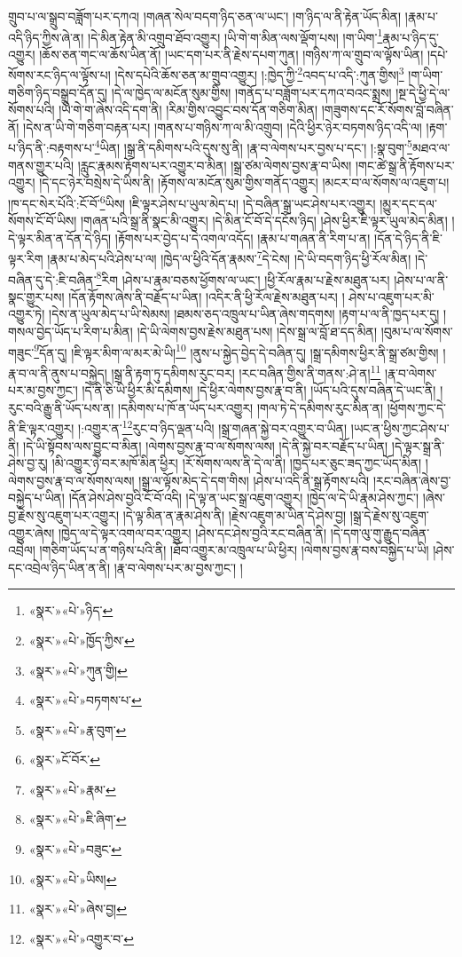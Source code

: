གྲུབ་པ་ལ་སྒྲུབ་བཟློག་པར་དཀའ། །གཞན་སེལ་བདག་ཉིད་ཅན་ལ་ཡང་། །ག་ཉིད་ལ་ནི་རྟེན་ཡོད་མིན། །རྣམ་པ་འདི་ཉིད་ཀྱིས་ཞེ་ན། །དེ་མིན་རྟེན་མི་འགྲུབ་ཐོབ་འགྱུར། །ཡི་གེ་ག་མིན་ལས་ལྡོག་པས། །ག་ཡིག་\footnote{«སྣར་»«པེ་»ཉིད་}རྣམ་པ་ཉིད་དུ་འགྱུར། །ཆོས་ཅན་གང་ལ་ཆོས་ཡིན་ནོ། །ཡང་དག་པར་ནི་རྗེས་དཔག་ཀུན། །གཉིས་ཀ་ལ་གྲུབ་ལ་ལྟོས་ཡིན། །དཔེ་སོགས་རང་ཉིད་ལ་ལྟོས་པ། །དེས་དཔེའི་ཆོས་ཅན་མ་གྲུབ་འགྱུར། །:ཁྱེད་ཀྱི་\footnote{«སྣར་»«པེ་»ཁྱོད་ཀྱིས་}འབད་པ་འདི་:ཀུན་གྱིས།\footnote{«སྣར་»«པེ་»ཀུན་གྱི།} །ག་ཡིག་གཅིག་ཉིད་བསྒྲུབ་དོན་དུ། །དེ་ལ་ཁྱེད་ལ་མངོན་སུམ་གྱིས། །གནོད་པ་བཟློག་པར་དཀའ་བའང་སྨྲས། །སྔ་དེ་ཕྱི་དེ་ལ་སོགས་པའི། །ཡི་གེ་ག་ཞེས་འདི་དག་ནི། །རིམ་གྱིས་འབྱུང་བས་དོན་གཅིག་མིན། །གཟུགས་དང་རོ་སོགས་བློ་བཞིན་ནོ། །དེས་ན་ཡི་གེ་གཅིག་བརྟན་པར། །གནས་པ་གཉིས་ཀ་ལ་མི་འགྲུབ། །དེའི་ཕྱིར་ཉེར་བཏགས་ཉིད་འདི་ལ། །རྟག་པ་ཉིད་ནི་:བརྟགས་པ་\footnote{«སྣར་»«པེ་»བཏགས་པ་}ཡིན། །སྒྲ་ནི་དམིགས་པའི་དུས་སུ་ནི། །རྣ་བ་ལེགས་པར་བྱས་པ་དང་། །:སྣ་བུག་\footnote{«སྣར་»«པེ་»རྣ་བུག་}མཐའ་ལ་གནས་གྱུར་པའི། །རླུང་རྣམས་རྟོགས་པར་འགྱུར་བ་མིན། །སྒྲ་ཙམ་ལེགས་བྱས་རྣ་བ་ཡིས། །གང་ཚེ་སྒྲ་ནི་རྟོགས་པར་འགྱུར། །དེ་དང་ཉེར་བསྲེས་དེ་ཡིས་ནི། །རྟོགས་ལ་མངོན་སུམ་གྱིས་གནོད་འགྱུར། །མངར་བ་ལ་སོགས་ལ་འཇུག་པ། །ཁ་དང་སེར་པོའི་:ངོ་བོ་\footnote{«སྣར་»ངོ་བོར་}ཡིས། །ཇི་ལྟར་ཤེས་པ་ཡུལ་མེད་པ། །དེ་བཞིན་སྒྲ་ཡང་ཤེས་པར་འགྱུར། །མྱུར་དང་དལ་སོགས་ངོ་བོ་ཡིས། །གཞན་པའི་སྒྲ་ནི་སྣང་མི་འགྱུར། །དེ་མིན་ངོ་བོ་དེ་དངོས་ཉིད། །ཤེས་ཕྱིར་ཇི་ལྟར་ཡུལ་མེད་མིན། །དེ་ལྟར་མིན་ན་དོན་དེ་ཉིད། །རྟོགས་པར་བྱེད་པ་དེ་འགལ་འདོད། །རྣམ་པ་གཞན་ནི་རིག་པ་ན། །དོན་དེ་ཉིད་ནི་ཇི་ལྟར་རིག །རྣམ་པ་མེད་པའི་ཤེས་པ་ལ། །ཁྱེད་ལ་ཕྱིའི་དོན་རྣམས་\footnote{«སྣར་»«པེ་»རྣམ་}དེ་ངེས། །དེ་ཡི་བདག་ཉིད་ཕྱི་རོལ་མིན། །དེ་བཞིན་དུ་དེ་:ཇི་བཞིན་\footnote{«སྣར་»«པེ་»ཇི་ཞིག་}རིག །ཤེས་པ་རྣམ་བཅས་ཕྱོགས་ལ་ཡང་། །ཕྱི་རོལ་རྣམ་པ་རྗེས་མཐུན་པར། །ཤེས་པ་ལ་ནི་སྣང་གྱུར་པས། །དོན་རྟོགས་ཞེས་ནི་བརྗོད་པ་ཡིན། །འདིར་ནི་ཕྱི་རོལ་རྗེས་མཐུན་པར། །
ཤེས་པ་འཇུག་པར་མི་འགྱུར་ཏེ། །དེས་ན་ཡུལ་མེད་པ་ཡི་སེམས། །ཐམས་ཅད་འཁྲུལ་པ་ཡིན་ཞེས་གདགས། །རྟག་པ་ལ་ནི་ཁྱད་པར་དུ། །གསལ་བྱེད་ཡོད་པ་རིག་པ་མིན། །དེ་ཡི་ལེགས་བྱས་རྗེས་མཐུན་པས། །དེས་སྒྲ་ལ་བློ་ཐ་དད་མིན། །བུམ་པ་ལ་སོགས་གཟུང་\footnote{«སྣར་»«པེ་»བཟུང་}དོན་དུ། །ཇི་ལྟར་མིག་ལ་མར་མེ་ཡི།\footnote{«སྣར་»«པེ་»ཡིས།} །ནུས་པ་སྐྱེད་བྱེད་དེ་བཞིན་དུ། །སྒྲ་དམིགས་ཕྱིར་ནི་སྒྲ་ཙམ་གྱིས། །རྣ་བ་ལ་ནི་ནུས་པ་བསྐྱེད། །སྒྲ་ནི་རྟག་ཏུ་དམིགས་རུང་བར། །རང་བཞིན་གྱིས་ནི་གནས་:ཤེ་ན།\footnote{«སྣར་»«པེ་»ཞེས་བྱ།} །རྣ་བ་ལེགས་པར་མ་བྱས་ཀྱང་། །དེ་ནི་ཅི་ཡི་ཕྱིར་མི་དམིགས། །དེ་ཕྱིར་ལེགས་བྱས་རྣ་བ་ནི། །ཡོད་པའི་དུས་བཞིན་དེ་ཡང་ནི། །རུང་བའི་རྒྱུ་ནི་ཡོད་པས་ན། །དམིགས་པ་ཁོ་ན་ཡོད་པར་འགྱུར། །གལ་ཏེ་དེ་དམིགས་རུང་མིན་ན། །ཕྱོགས་ཀྱང་དེ་ནི་ཇི་ལྟར་འགྱུར། །:འགྱུར་ན་\footnote{«སྣར་»«པེ་»འགྱུར་བ་}རུང་བ་ཉིད་ལྡན་པའི། །སྒྲ་གཞན་སྐྱེ་བར་འགྱུར་བ་ཡིན། །ཡང་ན་ཕྱིས་ཀྱང་ཤེས་པ་ནི། །དེ་ཡི་སྟོབས་ལས་བྱུང་བ་མིན། །ལེགས་བྱས་རྣ་བ་ལ་སོགས་ལས། །དེ་ནི་སྐྱེ་བར་བརྗོད་པ་ཡིན། །དེ་ལྟར་སྒྲ་ནི་ཤེས་བྱ་རུ། །མི་འགྱུར་ཉེ་བར་མཁོ་མིན་ཕྱིར། །རོ་སོགས་ལས་ནི་དེ་ལ་ནི། །ཁྱད་པར་ཅུང་ཟད་ཀྱང་ཡོད་མིན། །ལེགས་བྱས་རྣ་བ་ལ་སོགས་ལས། །སྒྲ་ལ་ལྟོས་མེད་དེ་དག་གིས། །ཤེས་པ་འདི་ནི་སྒྲ་རྟོགས་པའི། །རང་བཞིན་ཞེས་བྱ་བསྐྱེད་པ་ཡིན། །དོན་ཤེས་ཤེས་བྱའི་ངོ་བོ་འདི། །དེ་ལྟ་ན་ཡང་སྒྲ་འཇུག་འགྱུར། །ཁྱེད་ལ་དེ་ཡི་རྣམ་ཤེས་ཀྱང་། །ཞེས་བྱ་རྗེས་སུ་འཇུག་པར་འགྱུར། །དེ་ལྟ་མིན་ན་རྣམ་ཤེས་ནི། །རྗེས་འཇུག་མ་ཡིན་དེ་ཤེས་བྱ། །སྒྲ་དེ་རྗེས་སུ་འཇུག་འགྱུར་ཞེས། །ཁྱེད་ལ་དེ་ལྟར་འགལ་བར་འགྱུར། །ཤེས་དང་ཤེས་བྱའི་རང་བཞིན་ནི། །དེ་དག་ལུ་གུ་རྒྱུད་བཞིན་འབྲེལ། །གཅིག་ཡོད་པ་ན་གཉིས་པའི་ནི། །ཐོབ་འགྱུར་མ་འཁྲུལ་པ་ཡི་ཕྱིར། །ལེགས་བྱས་རྣ་བས་བསྐྱེད་པ་ཡི། །ཤེས་དང་འབྲེལ་ཉིད་ཡིན་ན་ནི། །རྣ་བ་ལེགས་པར་མ་བྱས་ཀྱང་། །
